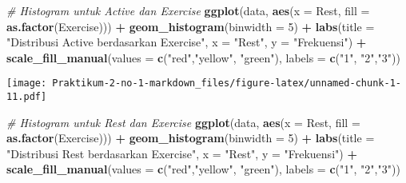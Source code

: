 \documentclass[
]{article}
\newenvironment{Shaded}{\begin{snugshade}}{\end{snugshade}}
\newcommand{\AttributeTok}[1]{\textcolor[rgb]{0.13,0.29,0.53}{#1}}
\newcommand{\CommentTok}[1]{\textcolor[rgb]{0.56,0.35,0.01}{\textit{#1}}}
\newcommand{\DecValTok}[1]{\textcolor[rgb]{0.00,0.00,0.81}{#1}}
\newcommand{\FunctionTok}[1]{\textcolor[rgb]{0.13,0.29,0.53}{\textbf{#1}}}
\newcommand{\NormalTok}[1]{#1}
\newcommand{\SpecialCharTok}[1]{\textcolor[rgb]{0.81,0.36,0.00}{\textbf{#1}}}
\newcommand{\StringTok}[1]{\textcolor[rgb]{0.31,0.60,0.02}{#1}}
\begin{document}
\begin{Shaded}
\begin{Highlighting}[]
\CommentTok{\# Histogram untuk Active dan Exercise}
\FunctionTok{ggplot}\NormalTok{(data, }\FunctionTok{aes}\NormalTok{(}\AttributeTok{x =}\NormalTok{ Rest, }\AttributeTok{fill =} \FunctionTok{as.factor}\NormalTok{(Exercise))) }\SpecialCharTok{+}
  \FunctionTok{geom\_histogram}\NormalTok{(}\AttributeTok{binwidth =} \DecValTok{5}\NormalTok{) }\SpecialCharTok{+}
  \FunctionTok{labs}\NormalTok{(}\AttributeTok{title =} \StringTok{"Distribusi Active berdasarkan Exercise"}\NormalTok{,}
       \AttributeTok{x =} \StringTok{"Rest"}\NormalTok{,}
       \AttributeTok{y =} \StringTok{"Frekuensi"}\NormalTok{) }\SpecialCharTok{+}
  \FunctionTok{scale\_fill\_manual}\NormalTok{(}\AttributeTok{values =} \FunctionTok{c}\NormalTok{(}\StringTok{"red"}\NormalTok{,}\StringTok{"yellow"}\NormalTok{, }\StringTok{"green"}\NormalTok{), }
                    \AttributeTok{labels =} \FunctionTok{c}\NormalTok{(}\StringTok{"1"}\NormalTok{, }\StringTok{"2"}\NormalTok{,}\StringTok{"3"}\NormalTok{))}
\end{Highlighting}
\end{Shaded}

\texttt{[image: Praktikum-2-no-1-markdown\_files/figure-latex/unnamed-chunk-1-11.pdf]}

\begin{Shaded}
\begin{Highlighting}[]
\CommentTok{\# Histogram untuk Rest dan Exercise}
\FunctionTok{ggplot}\NormalTok{(data, }\FunctionTok{aes}\NormalTok{(}\AttributeTok{x =}\NormalTok{ Rest, }\AttributeTok{fill =} \FunctionTok{as.factor}\NormalTok{(Exercise))) }\SpecialCharTok{+}
  \FunctionTok{geom\_histogram}\NormalTok{(}\AttributeTok{binwidth =} \DecValTok{5}\NormalTok{) }\SpecialCharTok{+}
  \FunctionTok{labs}\NormalTok{(}\AttributeTok{title =} \StringTok{"Distribusi Rest berdasarkan Exercise"}\NormalTok{,}
       \AttributeTok{x =} \StringTok{"Rest"}\NormalTok{,}
       \AttributeTok{y =} \StringTok{"Frekuensi"}\NormalTok{) }\SpecialCharTok{+}
  \FunctionTok{scale\_fill\_manual}\NormalTok{(}\AttributeTok{values =} \FunctionTok{c}\NormalTok{(}\StringTok{"red"}\NormalTok{,}\StringTok{"yellow"}\NormalTok{, }\StringTok{"green"}\NormalTok{), }
                    \AttributeTok{labels =} \FunctionTok{c}\NormalTok{(}\StringTok{"1"}\NormalTok{, }\StringTok{"2"}\NormalTok{,}\StringTok{"3"}\NormalTok{))}
\end{Highlighting}
\end{Shaded}
\end{document}
